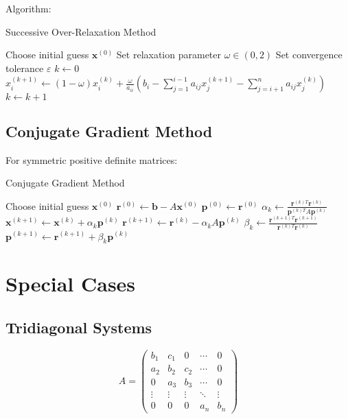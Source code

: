 \documentclass{article}
\begin{document}
Algorithm:
\begin{algorithm}
\caption{Successive Over-Relaxation Method}
\begin{algorithmic}[1]
\State Choose initial guess $\mathbf{x}^{(0)}$
\State Set relaxation parameter $\omega \in (0,2)$
\State Set convergence tolerance $\varepsilon$
\State $k \gets 0$
\Repeat
        \State $x_i^{(k+1)} \gets (1-\omega)x_i^{(k)} + \frac{\omega}{a_{ii}} \left(b_i - \sum_{j=1}^{i-1} a_{ij}x_j^{(k+1)} - \sum_{j=i+1}^{n} a_{ij}x_j^{(k)}\right)$
    \EndFor
    \State $k \gets k + 1$
\end{algorithmic}
\end{algorithm}

\subsection{Conjugate Gradient Method}

For symmetric positive definite matrices:

\begin{algorithm}
\caption{Conjugate Gradient Method}
\begin{algorithmic}[1]
\State Choose initial guess $\mathbf{x}^{(0)}$
\State $\mathbf{r}^{(0)} \gets \mathbf{b} - A\mathbf{x}^{(0)}$
\State $\mathbf{p}^{(0)} \gets \mathbf{r}^{(0)}$
    \State $\alpha_k \gets \frac{\mathbf{r}^{(k)T}\mathbf{r}^{(k)}}{\mathbf{p}^{(k)T}A\mathbf{p}^{(k)}}$
    \State $\mathbf{x}^{(k+1)} \gets \mathbf{x}^{(k)} + \alpha_k\mathbf{p}^{(k)}$
    \State $\mathbf{r}^{(k+1)} \gets \mathbf{r}^{(k)} - \alpha_k A\mathbf{p}^{(k)}$
    \State $\beta_k \gets \frac{\mathbf{r}^{(k+1)T}\mathbf{r}^{(k+1)}}{\mathbf{r}^{(k)T}\mathbf{r}^{(k)}}$
    \State $\mathbf{p}^{(k+1)} \gets \mathbf{r}^{(k+1)} + \beta_k\mathbf{p}^{(k)}$
\EndFor
\end{algorithmic}
\end{algorithm}

\section{Special Cases}

\subsection{Tridiagonal Systems}

\begin{equation}
A = 
\begin{pmatrix}
b_1 & c_1 & 0 & \cdots & 0 \\
a_2 & b_2 & c_2 & \cdots & 0 \\
0 & a_3 & b_3 & \cdots & 0 \\
\vdots & \vdots & \vdots & \ddots & \vdots \\
0 & 0 & 0 & a_n & b_n
\end{pmatrix}
\end{equation}
\end{document}
